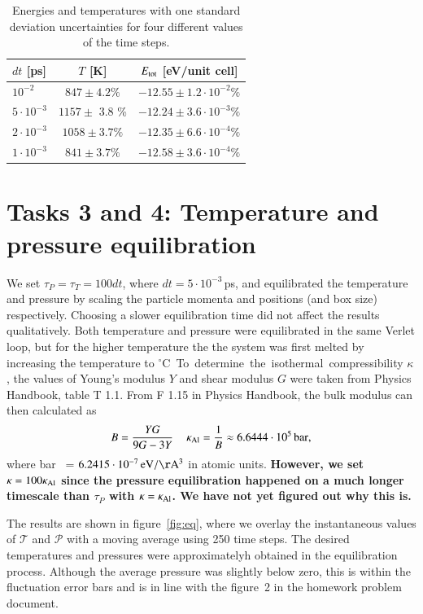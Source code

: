 \begin{table}[!ht]
  \begin{center}
    \caption{Energies and temperatures with one standard deviation uncertainties for four different values of the time steps.}
    \begin{tabular}{l c c} 
    $dt$ [ps] & $T$ [K] & $E_{\rm tot}$ [eV/unit cell]\\ \hline
$10^{-2}$ & 	$847 \pm 4.2\%$ &	$-12.55 \pm 1.2\cdot 10^{-2} \% $\\
$5\cdot 10^{-3}$ &	$1157 \pm$ 3.8 \% &$-12.24 \pm 3.6\cdot 10^{-3} \%$ \\
$2\cdot 10^{-3}$ & $1058  \pm 3.7 \% $ & 	$ -12.35 \pm 6.6\cdot 10^{-4} \% $\\ 
$1\cdot 10^{-3}$ & $ 841  \pm 3.7 \% $	 &$ -12.58 \pm 3.6\cdot 10^{-4} \%$ \\ 
      \hline
    \end{tabular}
    \label{tab:task2}
  \end{center}
\end{table}

\section*{Tasks 3 and 4: Temperature and pressure equilibration}
We set $\tau_P = \tau_T = 100 dt$, where $dt = 5\cdot 10^{-3}$\,ps, and equilibrated the temperature and pressure by scaling the particle momenta and positions (and box size) respectively. Choosing a slower equilibration time did not affect the results qualitatively. Both temperature and pressure were equilibrated in the same Verlet loop, but for the higher temperature the the system was first melted by increasing the temperature to \unit[900]{$^\circ$C}. To determine the isothermal compressibility $\kappa$, 
the values of Young's modulus $Y$ and shear modulus $G$ were taken from Physics Handbook, table T 1.1. From F 1.15 in Physics Handbook, the bulk modulus can then calculated as
\begin{equation}
B = \frac{YG}{9G - 3Y} \,\quad \kappa_{\rm Al} = \frac{1}{B} \approx \unit[6.6444\cdot 10^5]{bar},
\end{equation}
where \unit[1]{bar } = $\unit[6.2415\cdot 10^{-7}]{eV/\AA^3}$ in atomic units. \textbf{However, we set $\kappa = 100 \kappa_{\rm Al}$ since the pressure equilibration happened on a much longer timescale than $\tau_P$ with $\kappa = \kappa_{\rm Al}$. We have not yet figured out why this is. }

The results are shown in figure~\ref{fig:eq}, where we overlay the instantaneous values of $\mathcal{T}$ and $\mathcal{P}$ with a moving average using 250 time steps. The desired temperatures and pressures were approximatelyh obtained in the equilibration process. Although  the average pressure was slightly below zero, this is within the fluctuation error bars and is in line with the figure~2 in the homework problem document. 

